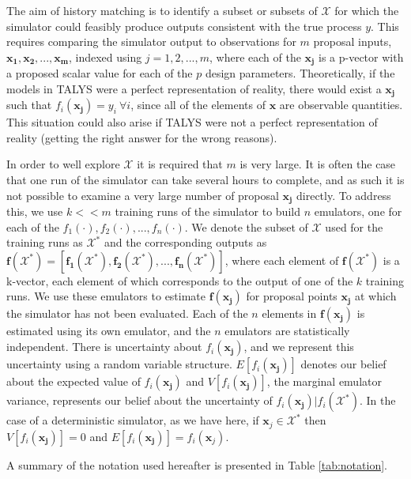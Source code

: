 \documentclass[
  12pt,
  a4paper,
  twoside]{book}
\begin{document}
The aim of history matching is to identify a subset or subsets of \(\mathcal{X}\) for which the simulator could feasibly produce outputs consistent with the true process \(y\). This requires comparing the simulator output to observations for \(m\) proposal inputs, \(\mathbf{x_1},\mathbf{x_2},...,\mathbf{x_m}\), indexed using \(j = 1,2,...,m\), where each of the \(\mathbf{x_j}\) is a p-vector with a proposed scalar value for each of the \(p\) design parameters. Theoretically, if the models in TALYS were a perfect representation of reality, there would exist a \(\mathbf{x_j}\) such that \(f_i(\mathbf{x_j})= y_i~ \forall i\), since all of the elements of \(\mathbf{x}\) are observable quantities. This situation could also arise if TALYS were not a perfect representation of reality (getting the right answer for the wrong reasons).

In order to well explore \(\mathcal{X}\) it is required that \(m\) is very large. It is often the case that one run of the simulator can take several hours to complete, and as such it is not possible to examine a very large number of proposal \(\mathbf{x_j}\) directly. To address this, we use \(k<<m\) training runs of the simulator to build \(n\) emulators, one for each of the \(f_1(\cdot),f_2(\cdot),...,f_n(\cdot)\). We denote the subset of \(\mathcal{X}\) used for the training runs as \(\mathcal{X}^*\) and the corresponding outputs as \(\mathbf{f}(\mathcal{X}^*) = \left[\mathbf{f_1}(\mathcal{X}^*),\mathbf{f_2}(\mathcal{X}^*),...,\mathbf{f_n}(\mathcal{X}^*)\right]\), where each element of \(\mathbf{f}(\mathcal{X}^*)\) is a k-vector, each element of which corresponds to the output of one of the \(k\) training runs. We use these emulators to estimate \(\mathbf{f}(\mathbf{x_j})\) for proposal points \(\mathbf{x_j}\) at which the simulator has not been evaluated. Each of the \(n\) elements in \(\mathbf{f}(\mathbf{x_j})\) is estimated using its own emulator, and the \(n\) emulators are statistically independent. There is uncertainty about \(f_i(\mathbf{x_j})\), and we represent this uncertainty using a random variable structure. \(E[f_i(\mathbf{x_j})]\) denotes our belief about the expected value of \(f_i(\mathbf{x_j})\) and \(V[f_i(\mathbf{x_j})]\), the marginal emulator variance, represents our belief about the uncertainty of \(f_i(\mathbf{x_j})|f_i(\mathcal{X}^*)\). In the case of a deterministic simulator, as we have here, if \(\mathbf{x}_j \in \mathcal{X}^*\) then \(V[f_i(\mathbf{x_j})] = 0\) and \(E[f_i(\mathbf{x_j})] = f_i(\mathbf{x}_j)\).

A summary of the notation used hereafter is presented in Table \ref{tab:notation}.
\end{document}
